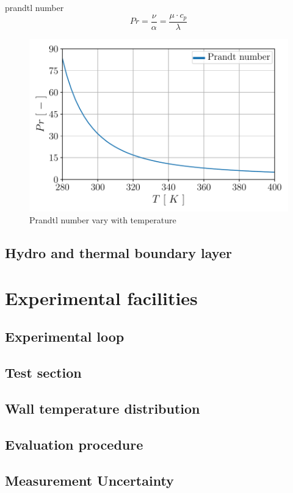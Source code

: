 \documentclass[12pt,oneside]{jbook}
\begin{document}
prandtl number
\begin{equation}
	Pr = \frac{\nu}{\alpha}= \frac{\mu \cdot c_{p}}{\lambda}
	\label{pr}
\end{equation}
\begin{figure}[ht]
	\vspace{0zh}
	\begin{center}
		\includegraphics[width=0.65\linewidth]{fig/mp_pr.pdf}
		\vspace{-1zh}
		\caption{Prandtl number vary with temperature}
		\label{pr}
	\end{center}
	\vspace{0zh}
\end{figure}

\clearpage
\section{Hydro and thermal boundary layer}

\chapter{Experimental facilities}
\section{Experimental loop}
\section{Test section}
\section{Wall temperature distribution}
\section{Evaluation procedure}
\section{Measurement Uncertainty}
\end{document}
